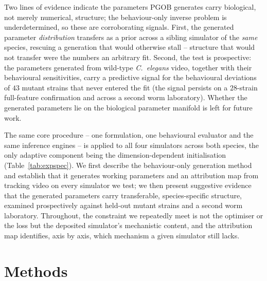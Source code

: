 \documentclass[11pt]{article}
\begin{document}
Two lines of evidence indicate the parameters PGOB generates carry biological, not merely numerical, structure; the behaviour-only inverse problem is underdetermined, so these are corroborating signals. First, the generated parameter \emph{distribution} transfers as a prior across a sibling simulator of the \emph{same} species, rescuing a generation that would otherwise stall -- structure that would not transfer were the numbers an arbitrary fit. Second, the test is prospective: the parameters generated from wild-type \emph{C.\ elegans} video, together with their behavioural sensitivities, carry a predictive signal for the behavioural deviations of $43$ mutant strains that never entered the fit (the signal persists on a $28$-strain full-feature confirmation and across a second worm laboratory). Whether the generated parameters lie on the biological parameter manifold is left for future work.

The same core procedure -- one formulation, one behavioural evaluator and the same inference engines -- is applied to all four simulators across both species, the only adaptive component being the dimension-dependent initialisation (Table~\ref{tab:expspec}). We first describe the behaviour-only generation method and establish that it generates working parameters and an attribution map from tracking video on every simulator we test; we then present suggestive evidence that the generated parameters carry transferable, species-specific structure, examined prospectively against held-out mutant strains and a second worm laboratory. Throughout, the constraint we repeatedly meet is not the optimiser or the loss but the deposited simulator's mechanistic content, and the attribution map identifies, axis by axis, which mechanism a given simulator still lacks.

\section{Methods}
\label{sec:methods}
\end{document}
